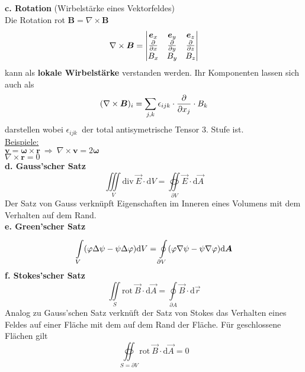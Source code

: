 \linebreak
\textbf{c. Rotation} (Wirbelstärke eines Vektorfeldes)\\
\linebreak
Die Rotation rot $\bm{B}=\nabla\times\bm{B}$
\begin{equation*}
\nabla\times\bm{B}=\begin{vmatrix}
\bm{e}_x & \bm{e}_y & \bm{e}_z \\
\frac{\partial{}}{\partial{x}} & \frac{\partial{}}{\partial{y}} & \frac{\partial{}}{\partial{z}}\\
B_x & B_y & B_z
\end{vmatrix}
\end{equation*}
kann als \textbf{lokale Wirbelstärke} verstanden werden. Ihr Komponenten lassen sich auch als
\begin{equation*}
(\nabla\times\bm{B})_i=\sum\limits_{j,k}\epsilon_{ijk}\cdot\frac{\partial{}}{\partial{x_j}}\cdot B_k
\end{equation*}
darstellen wobei $\epsilon_{ijk}\ $ der total antisymetrische Tensor 3. Stufe ist.\\
\linebreak
\underline{Beispiele:}\\
\linebreak
$\bm{v}=\bm{\omega}\times\bm{r} \ \Rightarrow \ \nabla\times\bm{v}=2\bm{\omega}$\\
$\nabla\times\bm{r}=0$\\
\linebreak\linebreak
\textbf{d. Gauss'scher Satz}\\
\begin{equation*}
\iiint\limits_V\mathrm{div\ }\vec{E}\cdot\mathrm{d}V=\oiint\limits_{\partial V}\vec{E}\cdot\mathrm{d}\vec{A}
\end{equation*}
Der Satz von Gauss verknüpft Eigenschaften im Inneren eines Volumens mit dem Verhalten auf dem Rand.\\
\linebreak
\textbf{e. Green'scher Satz}\\
\begin{equation*}
\int\limits_{V}^{} (\varphi\Delta\psi-\psi\Delta\varphi) \mathrm{d} V=\oint\limits_{\partial V}^{} (\varphi\nabla\psi-\psi\nabla\varphi) \mathrm{d} \bm{A}
\end{equation*}
\linebreak
\textbf{f. Stokes'scher Satz}\\
\begin{equation*}
\iint\limits_S\mathrm{rot\ }\vec{B}\cdot\mathrm{d}\vec{A}=\oint\limits_{\partial A}\vec{B}\cdot\mathrm{d}\vec{
r}
\end{equation*}
Analog zu Gauss'schen Satz verknüft der Satz von Stokes das Verhalten eines Feldes auf einer Fläche mit dem auf dem Rand der Fläche. Für geschlossene Flächen gilt
\begin{equation*}
\oiint\limits_{S=\partial V}\mathrm{rot\ }\vec{B}\cdot\mathrm{d}\vec{A}=0
\end{equation*}

